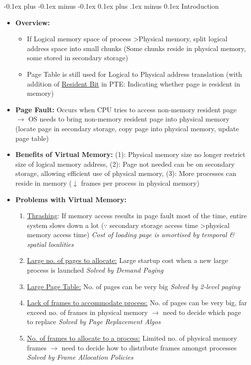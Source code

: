 \documentclass[landscape]{article}
\makeatletter
\renewcommand{\subsection}{\@startsection{subsection}{2}{0mm}%
  {-0.1ex plus -0.1ex minus -0.1ex}%
  {0.1ex plus .1ex minus 0.1ex}%
{\normalfont\scriptsize\bfseries}}
\makeatother
\begin{document}
\begin{multicols*}{6}
    \subsection{Introduction}
    \begin{itemize}
      \item \textbf{Overview:}
      \begin{itemize}
        \item If Logical memory space of process \textgreater Physical memory, split logical address space into small chunks (Some chunks reside in physical memory, some stored in secondary storage)
        \item Page Table is still used for Logical to Physical address translation (with addition of \underline{Resident Bit} in PTE: Indicating whether page is resident in memory)
      \end{itemize}
      \item \textbf{Page Fault:} Occurs when CPU tries to access non-memory resident page $\rightarrow$ OS needs to bring non-memory resident page into physical memory (locate page in secondary storage, copy page into physical memory, update page table)
      \item \textbf{Benefits of Virtual Memory:} (1): Physical memory size no longer restrict size of logical memory address, (2): Page not needed can be on secondary storage, allowing efficient use of physical memory, (3): More processes can reside in memory ($\downarrow$ frames per process in physical memory)
      \item \textbf{Problems with Virtual Memory:}
      \begin{enumerate}
        \item \underline{Thrashing}: If memory access results in page fault most of the time, entire system slows down a lot ($\because$ secondary storage access time \textgreater physical memory access time) \textit{Cost of loading page is amortised by temporal \& spatial localities}
        \item \underline{Large no. of pages to allocate:} Large startup cost when a new large process is launched \textit{Solved by Demand Paging}
        \item \underline{Large Page Table:} No. of pages can be very big \textit{Solved by 2-level paging}
        \item \underline{Lack of frames to accommodate process:} No. of pages can be very big, far exceed no. of frames in physical memory $\rightarrow$ need to decide which page to replace \textit{Solved by Page Replacement Algos}
        \item \underline{No. of frames to allocate to a process:} Limited no. of physical memory frames $\rightarrow$ need to decide how to distribute frames amongst processes \textit{Solved by Frame Allocation Policies}
      \end{enumerate}
    \end{itemize}


\end{multicols*}
\end{document}
